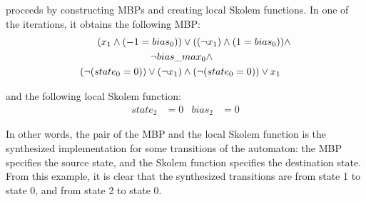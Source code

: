 \aeval proceeds by constructing MBPs and creating local Skolem functions. 
In one of the iterations, it obtains the following MBP:%
\begin{equation}
\begin{aligned}
  (x_1\land (-1=bias_0)) &\lor ((\neg x_1)\land (1=bias_0)) \land \\
  \neg bias\_&max_0 \land \\
  (\neg (state_0=0))\lor (\neg x_1) &\land
  (\neg (state_0=0))\lor x_1  \notag
\end{aligned}
\end{equation}

and the following local Skolem function:%
\begin{align*}
  state_2&=0 &
  bias_2&=0
\end{align*}

In other words, the pair of the MBP and the local Skolem function is the synthesized implementation for some transitions of the automaton: the MBP specifies the source state, and the Skolem function specifies the destination state.
From this example, it is clear that the synthesized transitions are from state 1 to state 0, and from state 2 to state 0.